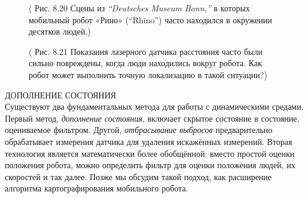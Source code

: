 \documentclass[10pt,a4paper]{article}
\begin{document}
\begin{figure}[H]
	\caption{ ( Рис. 8.20 Сцены из \textit{“Deutsches Museum Bonn,”} в которых мобильный робот «Рино» (“Rhino”) часто находился в окружении десятков людей.)}
	\label{fig:820orig}
\end{figure}

\begin{figure}[H]
	\caption{ ( Рис. 8.21 Показания лазерного датчика расстояния часто были сильно повреждены, когда люди находились вокруг робота. Как робот может выполнить точную локализацию в такой ситуации?)}
	\label{fig:821orig}
\end{figure}

ДОПОЛНЕНИЕ СОСТОЯНИЯ\\

Существуют два фундаментальных метода для работы с динамическими средами. Первый метод, \textit{дополнение состояния}, включает скрытое состояние в состояние, оцениваемое фильтром.  Другой, \textit{отбрасывание выбросов} предварительно обрабатывает измерения датчика для удаления искажённых измерений. Вторая технология является математически более обобщённой: вместо простой оценки положения робота, можно определить фильтр для оценки положения людей, их скоростей и так далее. Позже мы обсудим такой подход, как расширение алгоритма картографирования мобильного робота.
\end{document}
